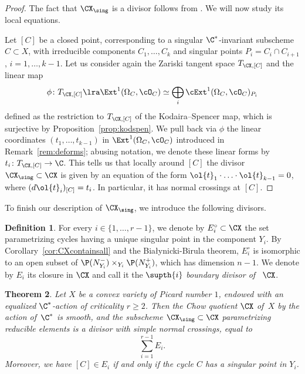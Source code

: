 \documentclass[11pt]{amsart}
\numberwithin{equation}{section}
\newtheorem{theorem}{Theorem}[section]
\theoremstyle{definition}
\newtheorem{definition}[theorem]{Definition}
\theoremstyle{remark}
\begin{document}
\begin{proof}
The fact that $\CX_{\sing}$ is a divisor follows from \cite[Propositions 6.2.11 and 6.3.5]{Talpo}.  We will now study its local equations.

Let $[C]$ be a closed point, corresponding to a singular $\C^*$-invariant subscheme $C\subset X$, with irreducible components $C_1,\dots, C_k$ and singular points $P_i=C_i\cap C_{i+1}$, $i=1,\dots,k-1$. Let us  consider again the Zariski tangent space $T_{\CX,[C]}$ and the linear map
$$
\phi\colon T_{\CX,[C]}\lra \Ext^1(\Omega_C,\cO_C)\simeq \bigoplus_i\cExt^1(\Omega_C,\cO_C)_{P_i}
$$ 
defined as the restriction to $T_{\CX,[C]}$ of the Kodaira--Spencer map, which is surjective by Proposition~\ref{prop:kodspen}. We pull back via $\phi$ the linear coordinates $(t_1,\dots, t_{k-1})$ in  $\Ext^1(\Omega_C,\cO_C)$ introduced in Remark~\ref{rem:deforms}; abusing notation, we denote these linear forms by $t_i\colon T_{\CX,[C]}\to\C$.  This tells us that locally around $[C]$ the divisor $\CX_{\sing}\subset\CX$ is given by an equation of the form $\ol{t}_1\cdot\ldots \cdot \ol{t}_{k-1}=0$, where $(d\ol{t}_i)_{[C]}=t_i$.  In particular, it has normal crossings at $[C]$. 
\end{proof}

To finish our description of $\CX_{\sing}$,  we introduce the following divisors.  

\begin{definition}\label{def:Ei}
For  every $i\in \{1,\dots,r-1\}$, we denote by $E^\circ_i\subset\CX$ the set parametrizing cycles having a unique singular point in the component $Y_i$. By Corollary~\ref{cor:CXcontainsall} and the Bia{\l}ynicki-Birula theorem, $E^\circ_i$ is isomorphic to an open subset of $\P(N_{Y_i}^-)\times_{Y_i}\P(N_{Y_i}^+)$, which has dimension $n-1$. We denote by $E_i$ its closure in $\CX$ and call it the $\supth{i}$ {\em boundary divisor of }\, $\CX$. 
\end{definition}


\begin{theorem}\label{thm:smoothborder} 
Let $X$ be a convex variety of Picard number $1$, endowed with an equalized $\C^*$-action of criticality $r\geq 2$. Then the Chow quotient $\CX$ of\, $X$ by the action of\, $\C^*$ is smooth, and the subscheme $\CX_{\sing}\subset\CX$ parametrizing reducible elements is a divisor with simple normal crossings, equal to
$$\sum_{i=1}^{r-1}E_i.$$
Moreover, we have $[C] \in E_i$ if and only if the cycle $C$ has a singular point in $Y_i$. 
\end{theorem}
\end{document}

